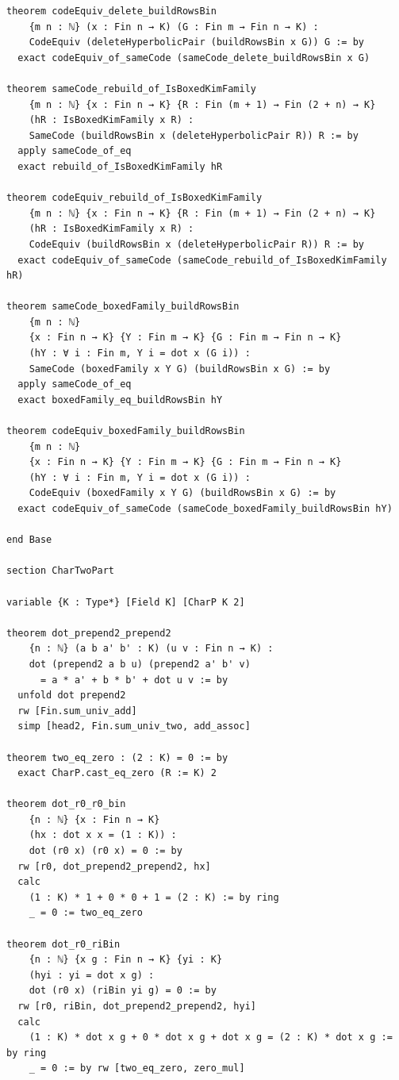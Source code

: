 \documentclass[12pt]{article}
\begin{document}
\begin{lstlisting}[caption={Lean verification for Theorem~\ref{thm:CZ_Kim_Lagrangian}.}]
theorem codeEquiv_delete_buildRowsBin
    {m n : ℕ} (x : Fin n → K) (G : Fin m → Fin n → K) :
    CodeEquiv (deleteHyperbolicPair (buildRowsBin x G)) G := by
  exact codeEquiv_of_sameCode (sameCode_delete_buildRowsBin x G)

theorem sameCode_rebuild_of_IsBoxedKimFamily
    {m n : ℕ} {x : Fin n → K} {R : Fin (m + 1) → Fin (2 + n) → K}
    (hR : IsBoxedKimFamily x R) :
    SameCode (buildRowsBin x (deleteHyperbolicPair R)) R := by
  apply sameCode_of_eq
  exact rebuild_of_IsBoxedKimFamily hR

theorem codeEquiv_rebuild_of_IsBoxedKimFamily
    {m n : ℕ} {x : Fin n → K} {R : Fin (m + 1) → Fin (2 + n) → K}
    (hR : IsBoxedKimFamily x R) :
    CodeEquiv (buildRowsBin x (deleteHyperbolicPair R)) R := by
  exact codeEquiv_of_sameCode (sameCode_rebuild_of_IsBoxedKimFamily hR)

theorem sameCode_boxedFamily_buildRowsBin
    {m n : ℕ}
    {x : Fin n → K} {Y : Fin m → K} {G : Fin m → Fin n → K}
    (hY : ∀ i : Fin m, Y i = dot x (G i)) :
    SameCode (boxedFamily x Y G) (buildRowsBin x G) := by
  apply sameCode_of_eq
  exact boxedFamily_eq_buildRowsBin hY

theorem codeEquiv_boxedFamily_buildRowsBin
    {m n : ℕ}
    {x : Fin n → K} {Y : Fin m → K} {G : Fin m → Fin n → K}
    (hY : ∀ i : Fin m, Y i = dot x (G i)) :
    CodeEquiv (boxedFamily x Y G) (buildRowsBin x G) := by
  exact codeEquiv_of_sameCode (sameCode_boxedFamily_buildRowsBin hY)

end Base

section CharTwoPart

variable {K : Type*} [Field K] [CharP K 2]

theorem dot_prepend2_prepend2
    {n : ℕ} (a b a' b' : K) (u v : Fin n → K) :
    dot (prepend2 a b u) (prepend2 a' b' v)
      = a * a' + b * b' + dot u v := by
  unfold dot prepend2
  rw [Fin.sum_univ_add]
  simp [head2, Fin.sum_univ_two, add_assoc]

theorem two_eq_zero : (2 : K) = 0 := by
  exact CharP.cast_eq_zero (R := K) 2

theorem dot_r0_r0_bin
    {n : ℕ} {x : Fin n → K}
    (hx : dot x x = (1 : K)) :
    dot (r0 x) (r0 x) = 0 := by
  rw [r0, dot_prepend2_prepend2, hx]
  calc
    (1 : K) * 1 + 0 * 0 + 1 = (2 : K) := by ring
    _ = 0 := two_eq_zero

theorem dot_r0_riBin
    {n : ℕ} {x g : Fin n → K} {yi : K}
    (hyi : yi = dot x g) :
    dot (r0 x) (riBin yi g) = 0 := by
  rw [r0, riBin, dot_prepend2_prepend2, hyi]
  calc
    (1 : K) * dot x g + 0 * dot x g + dot x g = (2 : K) * dot x g := by ring
    _ = 0 := by rw [two_eq_zero, zero_mul]


\end{lstlisting}
\end{document}
